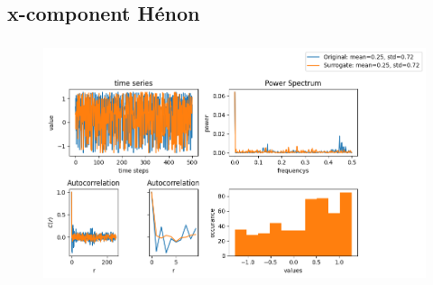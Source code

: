 \subsection{x-component Hénon}
\begin{frame}
  \frametitle{\insertsectionhead}
  \framesubtitle{\insertsubsectionhead}
\begin{figure}
  \centering
  \includegraphics[height=0.8\textheight]{figs/IID_henon.png}
\end{figure}
\end{frame}

